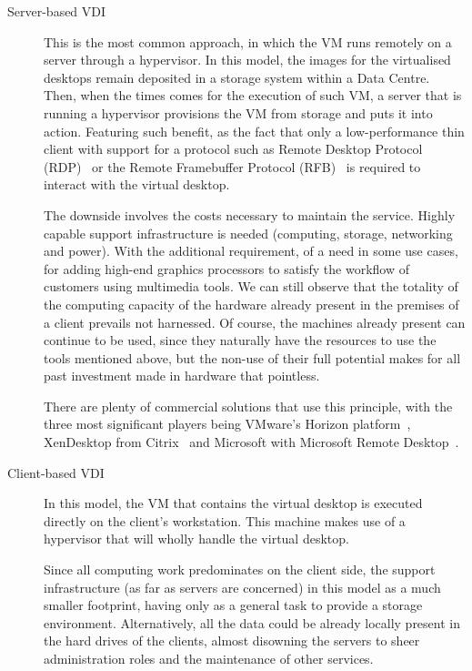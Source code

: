 \begin{description}
	\item [Server-based VDI] This is the most common approach, in which the VM runs remotely on a server through a hypervisor. In this model, the images for the virtualised desktops remain deposited in a storage system within a Data Centre. Then, when the times comes for the execution of such VM, a server that is running a hypervisor provisions the VM from storage and puts it into action. Featuring such benefit, as the fact that only a low-performance thin client with support for a protocol such as Remote Desktop Protocol (RDP)~\cite{Microsoft_RDP} or the Remote Framebuffer Protocol (RFB)~\cite{rfc6143} is required to interact with the virtual desktop.

        The downside involves the costs necessary to maintain the service. Highly capable support infrastructure is needed (computing, storage, networking and power). With the additional requirement, of a need in some use cases, for adding high-end graphics processors to satisfy the workflow of customers using multimedia tools. We can still observe that the totality of the computing capacity of the hardware already present in the premises of a client prevails not harnessed. Of course, the machines already present can continue to be used, since they naturally have the resources to use the tools mentioned above, but the non-use of their full potential makes for all past investment made in hardware that pointless.

        There are plenty of commercial solutions that use this principle, with the three most significant players being VMware's Horizon platform~\cite{VMware_horizon}, XenDesktop from Citrix~\cite{Citrix_XenDesktop} and Microsoft with Microsoft Remote Desktop~\cite{Microsoft_RDS}.
	\item [Client-based VDI] In this model, the VM that contains the virtual desktop is executed directly on the client's workstation. This machine makes use of a hypervisor that will wholly handle the virtual desktop.

		Since all computing work predominates on the client side, the support infrastructure (as far as servers are concerned) in this model as a much smaller footprint, having only as a general task to provide a storage environment. Alternatively, all the data could be already locally present in the hard drives of the clients, almost disowning the servers to sheer administration roles and the maintenance of other services.


\end{description}
